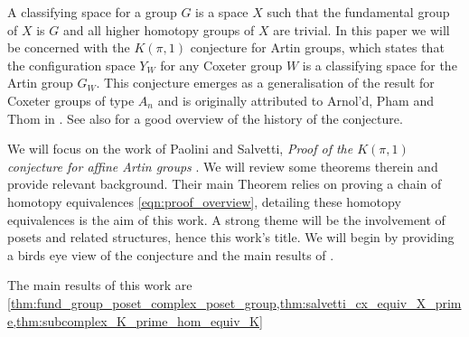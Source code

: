 \documentclass[class=guthesis, crop=false]{standalone}
\begin{document}
A classifying space for a group $G$ is a space $X$ such that the fundamental group of $X$ is $G$ and all higher homotopy groups of $X$ are trivial.
In this paper we will be concerned with the $K(\pi,1)$ conjecture for Artin groups, which states that the configuration space $Y_W$ for any Coxeter group $W$ is a classifying space for the Artin group $G_W$.  This conjecture emerges as a generalisation of the result for Coxeter groups of type $A_n$ and is originally attributed to Arnol'd, Pham and Thom in \cite{lek_homotopy_1983}. See also \cite{charney_davis_pi_1995} for a good overview of the history of the conjecture.

We will focus on the work of Paolini and Salvetti, \emph{Proof of the $K(\pi, 1)$ conjecture for affine Artin groups} \cite{paolini_salvetti_kpi1_2021}. We will review some theorems therein and provide relevant background. Their main Theorem relies on proving a chain of homotopy equivalences \eqref{eqn:proof_overview}, detailing these homotopy equivalences is the aim of this work. A strong theme will be the involvement of posets and related structures, hence this work's title. We will begin by providing a birds eye view of the conjecture and the  main results of \cite{paolini_salvetti_kpi1_2021}.

The main results of this work are \cref{thm:fund_group_poset_complex_poset_group,thm:salvetti_cx_equiv_X_prime,thm:subcomplex_K_prime_hom_equiv_K}
\end{document}
